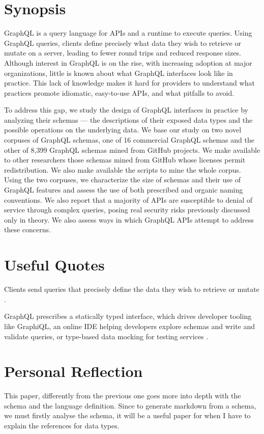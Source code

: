 \section{Synopsis}
\label{s:Synopsis-2}
GraphQL is a query language for APIs and a runtime to execute queries. Using
GraphQL queries, clients define precisely what data they wish to retrieve or
mutate on a server, leading to fewer round trips and reduced response sizes.
Although interest in GraphQL is on the rise, with increasing adoption at major
organizations, little is known about what GraphQL interfaces look like in
practice. This lack of knowledge makes it hard for providers to understand what
practices promote idiomatic, easy-to-use APIs, and what pitfalls to avoid.

To address this gap, we study the design of GraphQL interfaces in practice by
analyzing their schemas --- the descriptions of their exposed data types and the
possible operations on the underlying data. We base our study on two novel
corpuses of GraphQL schemas, one of 16 commercial GraphQL schemas and the other
of 8,399 GraphQL schemas mined from GitHub projects. We make available to other
researchers those schemas mined from GitHub whose licenses permit redistribution.
We also make available the scripts to mine the whole corpus. Using the two
corpuses, we characterize the size of schemas and their use of GraphQL features
and assess the use of both prescribed and organic naming conventions. We also
report that a majority of APIs are susceptible to denial of service through
complex queries, posing real security risks previously discussed only in theory.
We also assess ways in which GraphQL APIs attempt to address these concerns.

\section{Useful Quotes}
\label{s:Useful-Quotes-2}
Clients send queries that precisely define the data they wish to retrieve or
mutate \citep{witternEmpiricalStudyGraphQL2019a}.

GraphQL prescribes a statically typed interface, which drives developer tooling
like GraphiQL, an online IDE helping developers explore schemas and write and
validate queries, or type-based data mocking for testing services
\citep{witternEmpiricalStudyGraphQL2019a}.

\section{Personal Reflection}
\label{s:Personal-Reflection-2}
This paper, differently from the previous one goes more into depth with the schema and the language definition.
Since to generate markdown from a schema, we must firstly analyse the schema, it will be a useful paper for when
I have to explain the references for data types.

